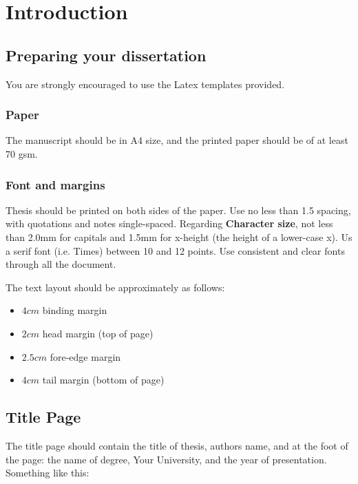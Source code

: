 
\chapter{Introduction} \label{chap:intro}

\section{Preparing your dissertation} \label{sect:thefirst}

You are strongly encouraged to use the Latex templates provided.

\subsection{Paper}
The manuscript should be in A4 size, and the printed paper should
be of at least 70 gsm.

\subsection{Font and margins}
Thesis should be printed on both sides of the paper. Use no less
than 1.5 spacing, with quotations and notes single-spaced.
Regarding \textbf{Character size}, not less than 2.0mm for
capitals and 1.5mm for x-height (the height of a lower-case x). Us
a serif font (i.e. Times) between 10 and 12 points. Use consistent
and clear fonts through all the document.

The text layout should be approximately as follows:

\begin{itemize}
    \item $4cm$ binding margin
    \item $2cm$ head margin (top of page)
    \item $2.5cm$ fore-edge margin
    \item $4cm$ tail margin (bottom of page)
\end{itemize}

\section{Title Page}
The title page should contain the title of thesis, authors name,
and at the foot of the page: the name of degree,  Your University,
and the year of presentation. Something like this:

